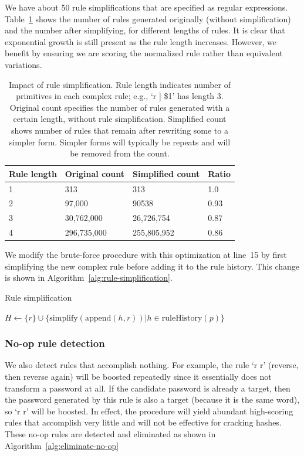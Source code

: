 \documentclass[letterpaper,twocolumn,10pt]{article}
\begin{document}
We have about 50 rule simplifications that are specified as regular
expressions. Table~\ref{tab:rule-simplification} shows the number of rules
generated originally (without simplification) and the number after simplifying,
for different lengths of rules. It is clear that exponential growth is still
present as the rule length increases. However, we benefit by ensuring we are
scoring the normalized rule rather than equivalent variations.

\begin{table}
\centering
\begin{tabular}{|l|l|l|l|}
\hline
Rule length & Original count & Simplified count & Ratio \\
\hline
1 & 313 & 313 & 1.0 \\
2 & 97,000 & 90538 & 0.93 \\
3 & 30,762,000 & 26,726,754 & 0.87 \\
4 & 296,735,000 & 255,805,952 & 0.86 \\
\hline
\end{tabular}
\caption{Impact of rule simplification. Rule length indicates number of
primitives in each complex rule; e.g., `r ] \$1' has length 3. Original count
specifies the number of rules generated with a certain length, without rule
simplification. Simplified count shows number of rules that remain after
rewriting some to a simpler form. Simpler forms will typically be repeats and
will be removed from the count.}
\label{tab:rule-simplification}
\end{table}

We modify the brute-force procedure with this optimization at line~15 by
first simplifying the new complex rule before adding it to the rule history.
This change is shown in Algorithm~\ref{alg:rule-simplification}.

\begin{algorithm}\caption{Rule simplification}
\begin{algorithmic}
    \State $H \gets \{r\}\cup\{\mathrm{simplify}(\mathrm{append}(h, r))|h \in%
\mathrm{ruleHistory}(p)\}$
\end{algorithmic}
\label{alg:rule-simplification}
\end{algorithm}

\subsubsection{No-op rule detection}

We also detect rules that accomplish nothing. For example, the rule `r r'
(reverse, then reverse again) will be boosted repeatedly since it essentially
does not transform a password at all. If the candidate password is already a
target, then the password generated by this rule is also a target (because it
is the same word), so `r r' will be boosted. In effect, the procedure will
yield abundant high-scoring rules that accomplish very little and will not be
effective for cracking hashes. These no-op rules are detected and eliminated as
shown in Algorithm~\ref{alg:eliminate-no-op}
\end{document}
